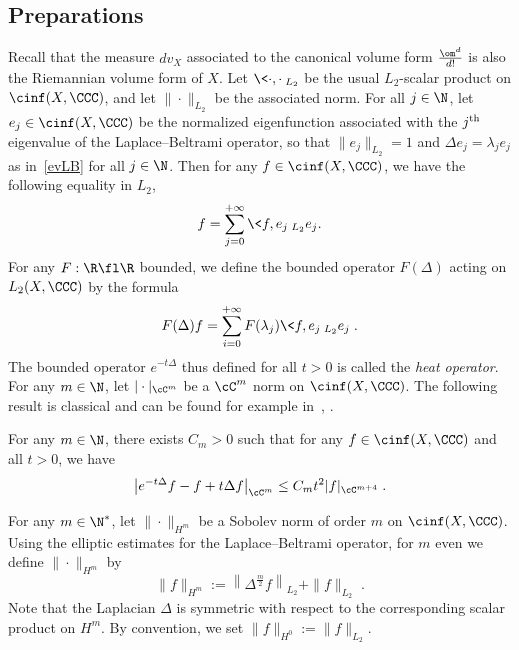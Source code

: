 \subsection{Preparations}\label{subsecprep}

Recall that the measure $dv_X$ associated to the canonical volume form $\frac{\om^d}{d!}$ is also the Riemannian volume form of $X$. Let $\<\cdot,\cdot\>_{L_2}$ be the usual $L_2$-scalar product on $\cinf(X,\CCC)$, and let $\|\cdot\|_{L_2}$ be the associated norm. For all $j\in\N$, let $e_j\in\cinf(X,\CCC)$ be the normalized eigenfunction associated with the $j^{\rm th}$ eigenvalue of the Laplace--Beltrami operator, so that $\|e_j\|_{L_2}=1$ and $\Delta e_j=\lambda_j e_j$ as in~\eqref{evLB} for all $j\in\N$. Then for any $f\in\cinf(X,\CCC)$, we have the following equality in $L_2$,
\begin{equation}
f=\sum_{j=0}^{+\infty}\<f,e_j\>_{L_2}e_j.
\end{equation}
For any $F:\R\fl\R$ bounded, we define the bounded operator $F(\Delta)$ acting on $L_2(X,\CCC)$ by the formula
\begin{equation}\label{calculfct}
F(\Delta)f=\sum_{i=0}^{+\infty} F(\lambda_j)\<f,e_j\>_{L_2}e_j\;.
\end{equation}
The bounded operator $e^{-t\Delta}$ thus defined for all $t>0$ is called the \emph{heat operator}. For any $m\in\N$, let $|\cdot|_{\cC^m}$ be a $\cC^m$ norm on $\cinf(X,\CCC)$. The following result is classical and can be found for example in~\cite{Kannai}, \cite[Theorem~2.29$\MK$(2.8)]{BGV04}.

\begin{prop}\label{heatexpprop}
For any $m\in\N$, there exists $C_m>0$ such that for any $f\in\cinf(X,\CCC)$ and all $t>0$, we have
\begin{equation}\label{heatexpfla}
\left|e^{-t\Delta}f-f+t\Delta f\right|_{\cC^m}\leq C_m t^2 |f|_{\cC^{m+4}}\;.
\end{equation}
\end{prop}

For any $m\in\N^*$, let $\|\cdot\|_{H^m}$ be a Sobolev norm of order $m$ on $\cinf(X,\CCC)$. Using the elliptic estimates for the Laplace--Beltrami operator, for $m$ even we define $\|\cdot\|_{H^m}$ by
\begin{equation}\label{ellest}
\|f\|_{H^m} := \left\|\Delta^{\frac{m}{2}}f\right\|_{L_2} + \|f\|_{L_2}\;.
\end{equation}
Note that the Laplacian $\Delta$ is symmetric with respect to the corresponding scalar product on $H^m$. By convention, we set $\|f\|_{H^0}:=\|f\|_{L_2}$.

